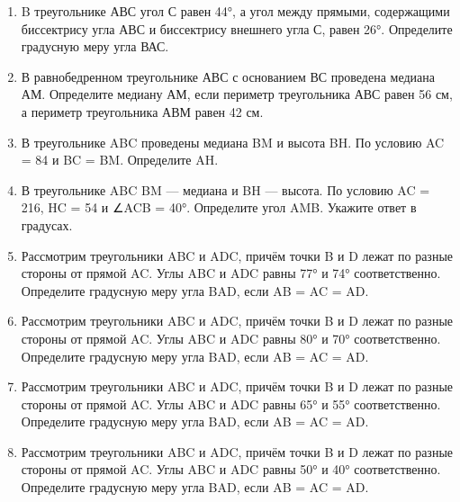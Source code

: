 \documentclass[a4paper,12pt]{article}
\newcommand{\taskspace}{\par\vspace{0.42cm}}
\begin{document}
\begin{enumerate}[resume]
\taskspace

\item B треугольнике АВС угол С равен 44°, а угол между прямыми, содержащими биссектрису угла АВС и биссектрису внешнего угла С, равен 26°. Определите градусную меру угла ВАС.

\taskspace

\item В равнобедренном треугольнике АВС с основанием ВС проведена медиана АМ. Определите медиану АМ, если периметр треугольника АВС равен 56 см, а периметр треугольника АВМ равен 42 см.

\taskspace

\item В треугольнике ABC проведены медиана BM и высота BH. По условию AC = 84 и BC = BM. Определите AH.

\taskspace

\item В треугольнике ABC BM --- медиана и BH --- высота. По условию AC = 216, HC = 54 и ∠ACB = 40°. Определите угол AMB. Укажите ответ в градусах.

\taskspace

\item Рассмотрим треугольники ABC и ADC, причём точки B и D лежат по разные стороны от прямой AC. Углы ABC и ADC равны 77° и 74° соответственно. Определите градусную меру угла BAD, если AB = AC = AD.

\taskspace

\item Рассмотрим треугольники ABC и ADC, причём точки B и D лежат по разные стороны от прямой AC. Углы ABC и ADC равны 80° и 70° соответственно. Определите градусную меру угла BAD, если AB = AC = AD.

\taskspace

\item Рассмотрим треугольники ABC и ADC, причём точки B и D лежат по разные стороны от прямой AC. Углы ABC и ADC равны 65° и 55° соответственно. Определите градусную меру угла BAD, если AB = AC = AD.

\taskspace

\item Рассмотрим треугольники ABC и ADC, причём точки B и D лежат по разные стороны от прямой AC. Углы ABC и ADC равны 50° и 40° соответственно. Определите градусную меру угла BAD, если AB = AC = AD.


\end{enumerate}
\end{document}
